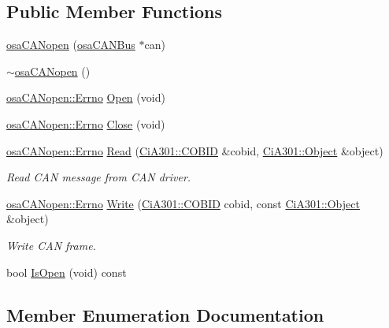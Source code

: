 \subsection*{Public Member Functions}
\begin{DoxyCompactItemize}
\item 
\hyperlink{classosa_c_a_nopen_a39228333ca59210a4d0eb3227b857adb}{osa\+C\+A\+Nopen} (\hyperlink{classosa_c_a_n_bus}{osa\+C\+A\+N\+Bus} $\ast$can)
\item 
\hyperlink{classosa_c_a_nopen_a2282ff320ac3d2149e517f296c43d161}{$\sim$osa\+C\+A\+Nopen} ()
\item 
\hyperlink{classosa_c_a_nopen_a5bf7839b2a382734c2f745e50ea7cfa0}{osa\+C\+A\+Nopen\+::\+Errno} \hyperlink{classosa_c_a_nopen_a051b423cffb19605b24deadba7e50eb2}{Open} (void)
\item 
\hyperlink{classosa_c_a_nopen_a5bf7839b2a382734c2f745e50ea7cfa0}{osa\+C\+A\+Nopen\+::\+Errno} \hyperlink{classosa_c_a_nopen_a35966647d08373baf0071864b79535ef}{Close} (void)
\item 
\hyperlink{classosa_c_a_nopen_a5bf7839b2a382734c2f745e50ea7cfa0}{osa\+C\+A\+Nopen\+::\+Errno} \hyperlink{classosa_c_a_nopen_afda6b68171e636e7b27abf1a7cc79aff}{Read} (\hyperlink{namespace_ci_a301_aec5b5dbb2b60d2837c60499f6f297aa7}{Ci\+A301\+::\+C\+O\+B\+I\+D} \&cobid, \hyperlink{struct_ci_a301_1_1_object}{Ci\+A301\+::\+Object} \&object)
\begin{DoxyCompactList}\small\item\em Read C\+A\+N message from C\+A\+N driver. \end{DoxyCompactList}\item 
\hyperlink{classosa_c_a_nopen_a5bf7839b2a382734c2f745e50ea7cfa0}{osa\+C\+A\+Nopen\+::\+Errno} \hyperlink{classosa_c_a_nopen_ae6e94cd07a1b12bb11158cc8936dd9b3}{Write} (\hyperlink{namespace_ci_a301_aec5b5dbb2b60d2837c60499f6f297aa7}{Ci\+A301\+::\+C\+O\+B\+I\+D} cobid, const \hyperlink{struct_ci_a301_1_1_object}{Ci\+A301\+::\+Object} \&object)
\begin{DoxyCompactList}\small\item\em Write C\+A\+N frame. \end{DoxyCompactList}\item 
bool \hyperlink{classosa_c_a_nopen_a34ad912ee7f24e4286c61caae295751a}{Is\+Open} (void) const 
\end{DoxyCompactItemize}


\subsection{Member Enumeration Documentation}
\hypertarget{classosa_c_a_nopen_a5bf7839b2a382734c2f745e50ea7cfa0}{}
